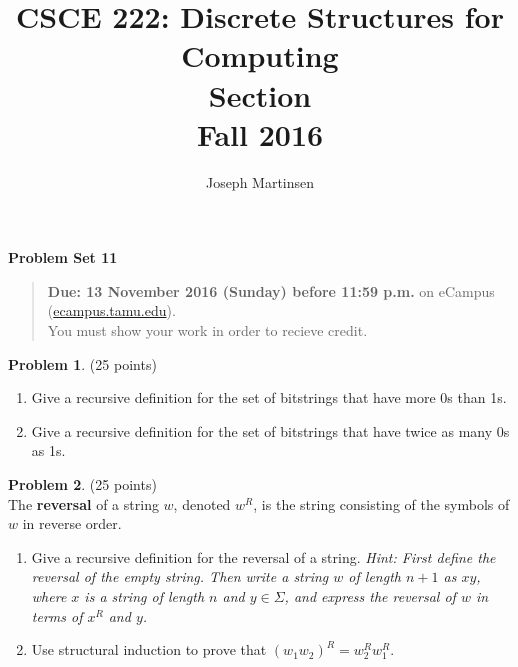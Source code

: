 \documentclass{article}
\title{CSCE 222: Discrete Structures for Computing\\Section \mysectionnumber\\Fall 2016}
\author{Joseph Martinsen}
\theoremstyle{definition}
\newtheorem{problem}{Problem}
\newtheorem*{solution}{Solution}
\newcommand{\problemset}[1]{\begin{center}\textbf{Problem Set #1}\end{center}}
\newcommand{\duedate}[1]{\begin{quote}\textbf{Due: #1} on eCampus (\url{ecampus.tamu.edu}). \\You must show your work in order to recieve credit.\end{quote}}
\begin{document}
\maketitle

\problemset{11}

\duedate{13 November 2016 (Sunday) before 11:59 p.m.}

\bigskip

\begin{problem} (25 points)
\begin{enumerate}
\item Give a recursive definition for the set of bitstrings that have more 0s than 1s.
\item Give a recursive definition for the set of bitstrings that have twice as many 0s as 1s.
\end{enumerate}

\end{problem}



\begin{problem} (25 points)\\
The \textbf{reversal} of a string $w$, denoted $w^R$, is the string consisting of the symbols of $w$ in reverse order.
\begin{enumerate}
\item Give a recursive definition for the reversal of a string. \textit{Hint: First define the reversal of the empty string.  Then write a string $w$ of length $n+1$ as $xy$, where $x$ is a string of length $n$ and $y\in\Sigma$, and express the reversal of $w$ in terms of $x^R$ and $y$.}
\item Use structural induction to prove that $(w_1w_2)^R = w_2^Rw_1^R$.
\end{enumerate}
\end{problem}


\end{document}
